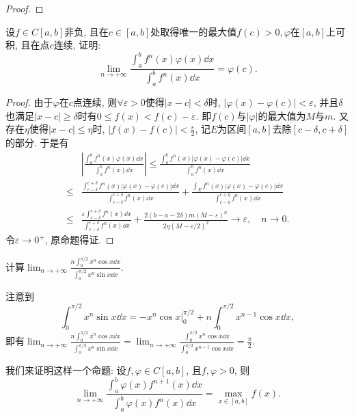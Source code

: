\begin{quizb}
\begin{proof}
\end{proof}
\woe 设\(f\in C[a,b]\)非负, 且在\(c\in[a,b]\)处取得唯一的最大值\(f(c)>0,\varphi\)在\([a,b]\)上可积, 且在点\(c\)连续, 证明: \[\lim_{n\rightarrow+\infty}\frac{\displaystyle\int_{a}^{b}f^n(x)\varphi(x)\dd x}{\displaystyle\int_{a}^{b}f^n(x)\dd x}=\varphi(c).\]
\begin{proof}
由于\(\varphi\)在\(c\)点连续, 则\(\forall \varepsilon>0\)使得\(|x-c|<\delta\)时, \(|\varphi(x)-\varphi(c)|<\varepsilon\), 并且\(\delta\)也满足\(|x-c|\geqslant\delta\)时有\(0\leqslant f(x)<f(c)-\varepsilon\). 即\(f(c)\)与\(|\varphi|\)的最大值为\(M\)与\(m\). 又存在\(\eta\)使得\(|x-c|\leqslant\eta\)时, \(|f(x)-f(c)|<\frac{\varepsilon}{2}\), 记\(E\)为区间\([a,b]\)去除\([c-\delta,c+\delta]\)的部分. 于是有\[\begin{split}
&\left|\frac{\displaystyle\int_{a}^{b}f^n(x)\varphi(x)\dd x}{\displaystyle\int_{a}^{b}f^n(x)\dd x}\right|\leqslant\frac{\displaystyle\int_{a}^{b}f^n(x)|\varphi(x)-\varphi(c)|\dd x}{\displaystyle\int_{a}^{b}f^n(x)\dd x}\\\leqslant&\frac{\displaystyle\int_{c-\delta}^{c+\delta}f^n(x)|\varphi(x)-\varphi(c)|\dd x}{\displaystyle\int_{c-\delta}^{c+\delta}f^n(x)\dd x}+\frac{\displaystyle\int_{E}f^n(x)|\varphi(x)-\varphi(c)|\dd x}{\displaystyle\int_{c-\eta}^{c+\eta}f^n(x)\dd x}\\\leqslant&\frac{\varepsilon\displaystyle\int_{c-\delta}^{c+\delta}f^n(x)\dd x}{\displaystyle\int_{c-\delta}^{c+\delta}f^n(x)\dd x}+\frac{2(b-a-2\delta)m(M-\varepsilon)^n}{2\eta(M-\varepsilon/2)^2}\rightarrow \varepsilon,\quad n\rightarrow 0.
\end{split}\]
令\(\varepsilon\rightarrow 0^+\), 原命题得证.
\end{proof}
\woe 计算\(\lim_{n\rightarrow+\infty}\frac{n\displaystyle\int_{0}^{\pi/2}x^n\cos x\dd x}{\displaystyle\int_{0}^{\pi/2}x^n\sin x\dd x}.\)
\begin{solution}
注意到\[\int_{0}^{\pi/2}x^n\sin x\dd x=-x^n\cos x\big|_0^{\pi/2}+n\int_{0}^{\pi/2}x^{n-1}\cos x\dd x,\]即有\(\lim_{n\rightarrow+\infty}\frac{n\displaystyle\int_{0}^{\pi/2}x^n\cos x\dd x}{\displaystyle\int_{0}^{\pi/2}x^n\sin x\dd x}=\lim_{n\rightarrow+\infty}\frac{\displaystyle\int_{0}^{\pi/2}x^n\cos x\dd x}{\displaystyle\int_{0}^{\pi/2}x^{n-1}\cos x\dd x}=\frac{\pi}{2}.\)
\end{solution}
我们来证明这样一个命题: 设\(f,\varphi\in C[a,b]\), 且\(f,\varphi>0\), 则\[\lim_{n\rightarrow+\infty}\frac{\displaystyle\int_{a}^{b}\varphi(x)f^{n+1}(x)\dd x}{\displaystyle\int_{a}^{b}\varphi(x)f^n(x)\dd x}=\max_{x\in[a,b]}f(x).\]

\end{quizb}
